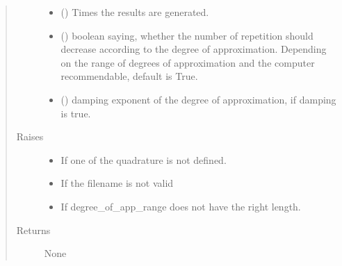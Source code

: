 \documentclass[letterpaper,10pt,english]{sphinxmanual}
\begin{document}
\begin{fulllineitems}
\begin{quote}
\begin{description}
\begin{itemize}
\item {} 
 () \textendash{} Times the results  are generated.

\item {} 
 (\sphinxstyleliteralemphasis{\sphinxupquote{, }}) \textendash{} boolean saying, whether the number of repetition should decrease according to the
degree of approximation. Depending on the range of degrees of approximation and the computer recommendable,
default is True.

\item {} 
 () \textendash{} damping exponent of the degree of approximation, if damping is true.

\end{itemize}

\item[{Raises}] \leavevmode\begin{itemize}
\item {} 
 \textendash{} If one of the quadrature is not defined.

\item {} 
 \textendash{} If the filename is not valid

\item {} 
 \textendash{} If degree\_of\_app\_range does not have the right length.

\end{itemize}

\item[{Returns}] \leavevmode
None

\end{description}\end{quote}

\end{fulllineitems}

\end{document}
